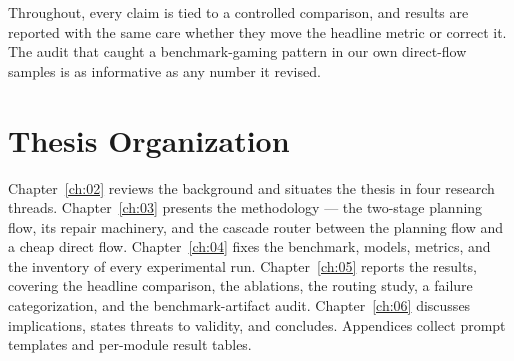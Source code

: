 Throughout, every claim is tied to a controlled comparison, and results
are reported with the same care whether they move the headline metric or
correct it. The audit that caught a benchmark-gaming pattern in our
own direct-flow samples is as informative as any number it revised.

\section{Thesis Organization}
\label{sec:intro-organization}

Chapter~\ref{ch:02} reviews the background and situates the thesis in
four research threads. Chapter~\ref{ch:03} presents the methodology
--- the two-stage planning flow, its repair machinery, and the cascade
router between the planning flow and a cheap direct flow.
Chapter~\ref{ch:04} fixes the benchmark,
models, metrics, and the inventory of every experimental run.
Chapter~\ref{ch:05} reports the results, covering the headline
comparison, the ablations, the routing study, a failure categorization,
and the benchmark-artifact audit. Chapter~\ref{ch:06} discusses implications,
states threats to validity, and concludes. Appendices collect prompt
templates and per-module result tables.
